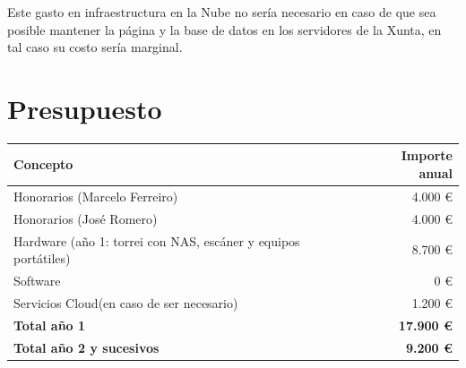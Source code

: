 \documentclass[11pt, a4paper]{article}
\begin{document}
Este gasto en infraestructura en la Nube no sería necesario en caso de que sea
posible mantener la página y la base de datos en los servidores de la Xunta, en
tal caso su costo sería marginal. 

\section*{Presupuesto}

\begin{table}[h]
\centering
\begin{tabular}{@{}lr@{}}
\toprule
\textbf{Concepto} & \textbf{Importe anual} \\
\midrule
Honorarios (Marcelo Ferreiro)          & 4.000 € \\
Honorarios (José Romero)               & 4.000 € \\
Hardware (año 1: torrei con NAS, escáner y equipos portátiles)      &  8.700 € \\
Software                               &      0 € \\
Servicios Cloud(en caso de ser necesario)                      &  1.200 € \\
\midrule
\textbf{Total año 1}                   & \textbf{17.900 €} \\
\textbf{Total año 2 y sucesivos}       & \textbf{9.200 €} \\
\bottomrule
\end{tabular}
\end{table}
\end{document}
